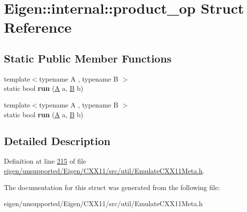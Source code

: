 \hypertarget{struct_eigen_1_1internal_1_1product__op}{}\section{Eigen\+:\+:internal\+:\+:product\+\_\+op Struct Reference}
\label{struct_eigen_1_1internal_1_1product__op}
\subsection*{Static Public Member Functions}
\begin{DoxyCompactItemize}
\item 
\mbox{\label{struct_eigen_1_1internal_1_1product__op_acde7156fdf6c42c27d9b4d92d33c4051}} 
{\footnotesize template$<$typename A , typename B $>$ }\\static bool {\bfseries run} (\hyperlink{group___core___module_class_eigen_1_1_matrix}{A} a, \hyperlink{group___core___module_class_eigen_1_1_matrix}{B} b)
\item 
\mbox{\label{struct_eigen_1_1internal_1_1product__op_acde7156fdf6c42c27d9b4d92d33c4051}} 
{\footnotesize template$<$typename A , typename B $>$ }\\static bool {\bfseries run} (\hyperlink{group___core___module_class_eigen_1_1_matrix}{A} a, \hyperlink{group___core___module_class_eigen_1_1_matrix}{B} b)
\end{DoxyCompactItemize}


\subsection{Detailed Description}


Definition at line \hyperlink{eigen_2unsupported_2_eigen_2_c_x_x11_2src_2util_2_emulate_c_x_x11_meta_8h_source_l00215}{215} of file \hyperlink{eigen_2unsupported_2_eigen_2_c_x_x11_2src_2util_2_emulate_c_x_x11_meta_8h_source}{eigen/unsupported/\+Eigen/\+C\+X\+X11/src/util/\+Emulate\+C\+X\+X11\+Meta.\+h}.



The documentation for this struct was generated from the following file\+:\begin{DoxyCompactItemize}
\item 
eigen/unsupported/\+Eigen/\+C\+X\+X11/src/util/\+Emulate\+C\+X\+X11\+Meta.\+h\end{DoxyCompactItemize}

